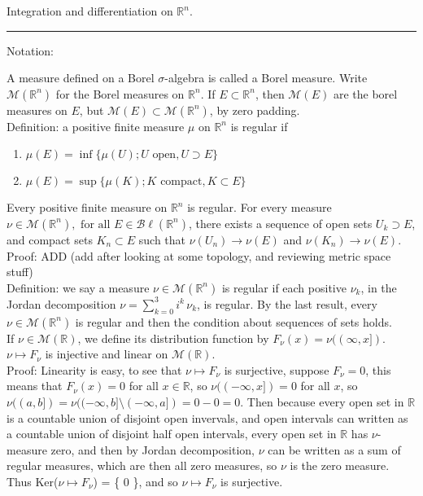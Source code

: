 \documentclass[12pt]{article}
\newcommand{\fall}[0] { \textrm{ for all } }
\newcommand{\rarw}[0] { \rightarrow }
\newcommand{\reals}[0] { \mathbb{R}}
\newcommand{\M}[0] { \mathcal{M} }
\newcommand{\Bl}[0] { \mathcal{B} \ell }
\begin{document}
\break

\begin{flushleft}
Integration and differentiation on $\reals^n$.
\end{flushleft}

\begin{flushleft}
\addvspace{5pt} \hrule
\end{flushleft}	


Notation:

A measure defined on a Borel $\sigma$-algebra is called a Borel measure. Write $\M(\reals^n)$ for the Borel measures on $\reals^n$. If $E \subset \reals^n$, then $\M(E)$ are the borel measures on $E$, but $\M(E) \subset \M(\reals^n)$, by zero padding. \\

Definition: a positive finite measure $\mu$ on $\reals^n$ is regular if

\begin{enumerate}
\item
$\mu(E) = \inf \{ \mu(U) ; U \textrm{ open}, U \supset E \}$
\item
$\mu(E) = \sup \{ \mu(K) ; K \textrm{ compact}, K \subset E \}$
\end{enumerate}

Every positive finite measure on $\reals^n$ is regular. For every measure $\nu \in \M(\reals^n), \fall E \in \Bl(\reals^n)$, there exists a sequence of open sets $U_k \supset E$, and compact sets $K_n \subset E$ such that $\nu(U_n) \rarw \nu(E)$ and $\nu(K_n) \rarw \nu(E)$. \\

\noindent
Proof: ADD (add after looking at some topology, and reviewing metric space stuff)  \\

Definition: we say a measure $\nu \in \M(\reals^n)$ is regular if each positive $\nu_k$, in the Jordan decomposition $\nu = \sum_{k=0}^3 i^k \, \nu_k$, is regular. By the last result, every $\nu \in \M(\reals^n)$ is regular and then the condition about sequences of sets holds. \\

If $\nu \in \M(\reals)$, we define its distribution function by $F_\nu (x) = \nu((\infty,x])$. $\nu \mapsto F_\nu$ is injective and linear on $\M(\reals)$. \\

\noindent
Proof: Linearity is easy, to see that $\nu \mapsto F_\nu$ is surjective, suppose $F_\nu = 0$, this means that $F_\nu(x) = 0$ for all $x \in \reals$, so $\nu((-\infty, x]) = 0$ for all $x$, so $\nu((a,b]) = \nu((-\infty,b] \setminus (-\infty,a]) = 0 - 0 = 0$. Then because every open set in $\reals$ is a countable union of disjoint open invervals, and open intervals can written as a countable union of disjoint half open intervals, every open set in $\reals$ has $\nu$-measure zero, and then by Jordan decomposition, $\nu$ can be written as a sum of regular measures, which are then all zero measures, so $\nu$ is the zero measure. Thus Ker($\nu \mapsto F_\nu$) = \{ 0 \}, and so $\nu \mapsto F_\nu$ is surjective. \\
\end{document}
